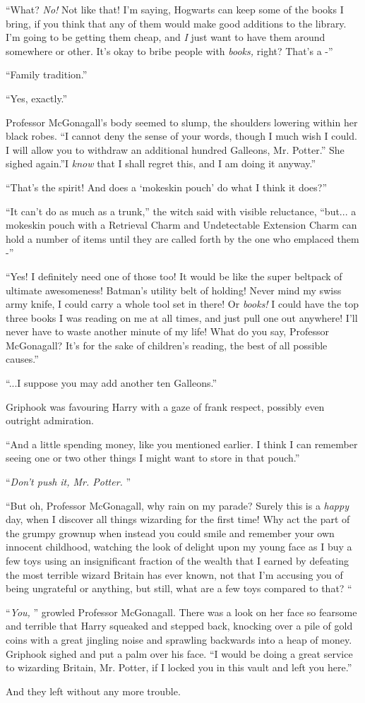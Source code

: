 ``What? \emph{No!} Not like that! I'm saying, Hogwarts can keep some of
the books I bring, if you think that any of them would make good
additions to the library. I'm going to be getting them cheap, and
\emph{I} just want to have them around somewhere or other. It's okay to
bribe people with \emph{books,} right? That's a -''

``Family tradition.''

``Yes, exactly.''

Professor McGonagall's body seemed to slump, the shoulders lowering
within her black robes. ``I cannot deny the sense of your words, though
I much wish I could. I will allow you to withdraw an additional hundred
Galleons, Mr. Potter.'' She sighed again.''I \emph{know} that I shall
regret this, and I am doing it anyway.''

``That's the spirit! And does a `mokeskin pouch' do what I think it
does?''

``It can't do as much as a trunk,'' the witch said with visible
reluctance, ``but... a mokeskin pouch with a Retrieval Charm and
Undetectable Extension Charm can hold a number of items until they are
called forth by the one who emplaced them -''

``Yes! I definitely need one of those too! It would be like the super
beltpack of ultimate awesomeness! Batman's utility belt of holding!
Never mind my swiss army knife, I could carry a whole tool set in there!
Or \emph{books!} I could have the top three books I was reading on me at
all times, and just pull one out anywhere! I'll never have to waste
another minute of my life! What do you say, Professor McGonagall? It's
for the sake of children's reading, the best of all possible causes.''

``...I suppose you may add another ten Galleons.''

Griphook was favouring Harry with a gaze of frank respect, possibly even
outright admiration.

``And a little spending money, like you mentioned earlier. I think I can
remember seeing one or two other things I might want to store in that
pouch.''

``\emph{Don't push it, Mr. Potter.} ''

``But oh, Professor McGonagall, why rain on my parade? Surely this is a
\emph{happy} day, when I discover all things wizarding for the first
time! Why act the part of the grumpy grownup when instead you could
smile and remember your own innocent childhood, watching the look of
delight upon my young face as I buy a few toys using an insignificant
fraction of the wealth that I earned by defeating the most terrible
wizard Britain has ever known, not that I'm accusing you of being
ungrateful or anything, but still, what are a few toys compared to that?
``

``\emph{You,} '' growled Professor McGonagall. There was a look on her
face so fearsome and terrible that Harry squeaked and stepped back,
knocking over a pile of gold coins with a great jingling noise and
sprawling backwards into a heap of money. Griphook sighed and put a palm
over his face. ``I would be doing a great service to wizarding Britain,
Mr. Potter, if I locked you in this vault and left you here.''

And they left without any more trouble.
